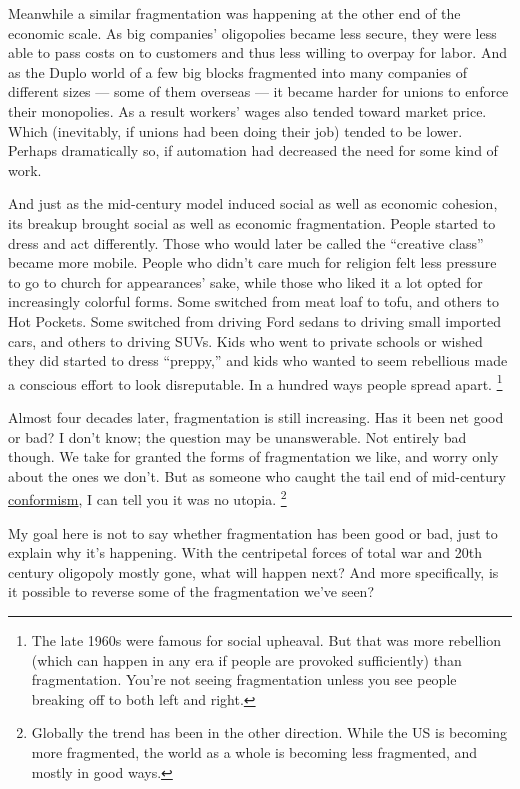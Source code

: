 \documentclass[12pt]{book}
\begin{document}
Meanwhile a similar fragmentation was happening at the other end of the
economic scale. As big companies' oligopolies became less secure, they
were less able to pass costs on to customers and thus less willing to
overpay for labor. And as the Duplo world of a few big blocks fragmented
into many companies of different sizes --- some of them overseas --- it
became harder for unions to enforce their monopolies. As a result
workers' wages also tended toward market price. Which (inevitably, if
unions had been doing their job) tended to be lower. Perhaps
dramatically so, if automation had decreased the need for some kind of
work.

And just as the mid-century model induced social as well as economic
cohesion, its breakup brought social as well as economic fragmentation.
People started to dress and act differently. Those who would later be
called the ``creative class'' became more mobile. People who didn't care
much for religion felt less pressure to go to church for appearances'
sake, while those who liked it a lot opted for increasingly colorful
forms. Some switched from meat loaf to tofu, and others to Hot Pockets.
Some switched from driving Ford sedans to driving small imported cars,
and others to driving SUVs. Kids who went to private schools or wished
they did started to dress ``preppy,'' and kids who wanted to seem
rebellious made a conscious effort to look disreputable. In a hundred
ways people spread apart. \footnote{The late 1960s were famous for social upheaval. But that was
more rebellion (which can happen in any era if people are provoked
sufficiently) than fragmentation. You're not seeing fragmentation unless
you see people breaking off to both left and right.}

Almost four decades later, fragmentation is still increasing. Has it
been net good or bad? I don't know; the question may be unanswerable.
Not entirely bad though. We take for granted the forms of fragmentation
we like, and worry only about the ones we don't. But as someone who
caught the tail end of mid-century
\href{https://books.google.com/ngrams/graph?content=well-adjusted&year_start=1800&year_end=2000&corpus=15&smoothing=3}{conformism},
I can tell you it was no utopia. \footnote{Globally the trend has been in the other direction. While the
US is becoming more fragmented, the world as a whole is becoming less
fragmented, and mostly in good ways.}

My goal here is not to say whether fragmentation has been good or bad,
just to explain why it's happening. With the centripetal forces of total
war and 20th century oligopoly mostly gone, what will happen next? And
more specifically, is it possible to reverse some of the fragmentation
we've seen?
\end{document}
